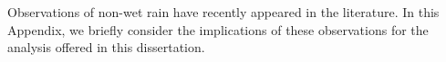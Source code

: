Observations of non-wet rain have recently appeared in the
literature.  In this Appendix, we briefly consider the
implications of these observations for the analysis offered in
this dissertation.
